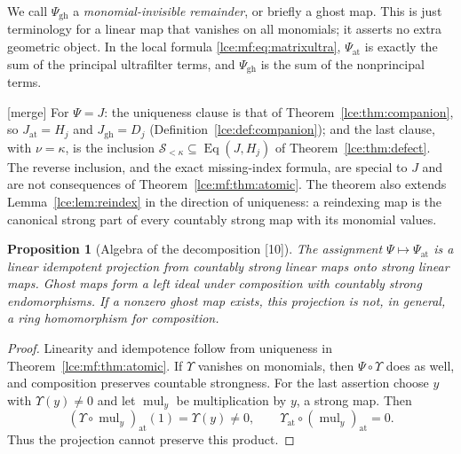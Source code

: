 \documentclass[11pt,letterpaper]{article}
\numberwithin{equation}{section}
\newtheorem{proposition}[theorem]{Proposition}
\theoremstyle{definition}
\theoremstyle{remark}
\newcommand{\Sk}{\mathscr S_{<\kappa}}
\newcommand{\thref}[1]{Theorem~\ref{#1}}
\newcommand{\leref}[1]{Lemma~\ref{#1}}
\newcommand{\src}[1]{\textup{\textsf{\small[#1]}}}%
\newcommand{\mergetag}{\textup{\textsf{\small[merge]}}}%
\newcommand{\Eq}{\operatorname{Eq}}
\newcommand{\at}{\mathrm{at}}
\newcommand{\gh}{\mathrm{gh}}
\begin{document}
We call $\Psi_{\gh}$ a \emph{monomial-invisible remainder}, or briefly a
ghost map. This is just terminology for a linear map that vanishes on all
monomials; it asserts no extra geometric object. In the local formula
\eqref{lce:mf:eq:matrixultra}, $\Psi_{\at}$ is exactly the sum of the
principal ultrafilter terms, and $\Psi_{\gh}$ is the sum of the
nonprincipal terms.

\mergetag{} For $\Psi=J$: the uniqueness clause is that of
\thref{lce:thm:companion}, so $J_{\at}=H_j$ and $J_{\gh}=D_j$
(Definition~\ref{lce:def:companion}); and the last clause, with $\nu=\kappa$,
is the inclusion $\Sk\subseteq\Eq(J,H_j)$ of \thref{lce:thm:defect}. The
reverse inclusion, and the exact missing-index formula, are special to $J$
and are not consequences of \thref{lce:mf:thm:atomic}. The theorem also
extends \leref{lce:lem:reindex} in the direction of uniqueness: a reindexing
map is the canonical strong part of every countably strong map with its
monomial values.

\begin{proposition}[Algebra of the decomposition \src{10}]\label{lce:mf:prop:algebra}
The assignment $\Psi\mapsto\Psi_{\at}$ is a linear idempotent projection from
countably strong linear maps onto strong linear maps. Ghost maps form a left
ideal under composition with countably strong endomorphisms. If a nonzero
ghost map exists, this projection is not, in general, a ring homomorphism
for composition.
\end{proposition}
\begin{proof}
Linearity and idempotence follow from uniqueness in
\thref{lce:mf:thm:atomic}. If $\Upsilon$ vanishes on monomials, then
$\Psi\circ\Upsilon$ does as well, and composition preserves countable
strongness. For the last assertion choose $y$ with $\Upsilon(y)\ne0$ and let
$\operatorname{mul}_y$ be multiplication by $y$, a strong map. Then
\[
 (\Upsilon\circ\operatorname{mul}_y)_{\at}(1)=\Upsilon(y)\ne0,
 \qquad \Upsilon_{\at}\circ(\operatorname{mul}_y)_{\at}=0.
\]
Thus the projection cannot preserve this product.
\end{proof}
\end{document}
